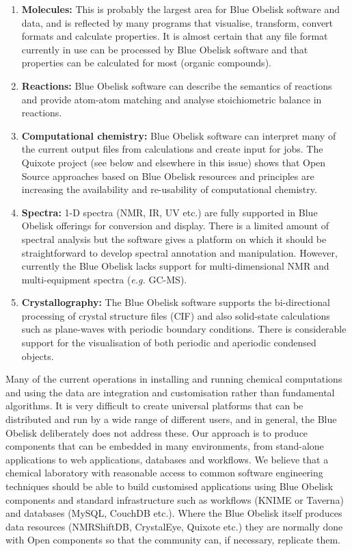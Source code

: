 \documentclass[10pt]{bmc_article}
\newenvironment{bmcformat}{\fussy\setboolean{publ}{true}}{\fussy}
\begin{document}
\begin{bmcformat}
\begin{enumerate}
\item {\bf Molecules:} This is probably the largest area for Blue
Obelisk software and data, and is reflected by many programs that
visualise, transform, convert formats and calculate properties. It is
almost certain that any file format currently in use can be processed by Blue
Obelisk software and that properties can be calculated for most (organic
compounds).
\item {\bf Reactions:} Blue Obelisk software can describe the
semantics of reactions and provide atom-atom matching and analyse
stoichiometric balance in reactions.
\item {\bf Computational chemistry:} Blue Obelisk software can
interpret many of the current output files from calculations and
create input for jobs. The Quixote project (see below and elsewhere in
this issue) shows that Open Source approaches based on Blue Obelisk
resources and principles are increasing the availability and
re-usability of computational chemistry.
\item {\bf Spectra:} 1-D spectra (NMR, IR, UV etc.) are fully
supported in Blue Obelisk offerings for conversion and display. There
is a limited amount of spectral analysis but the software gives a
platform on which it should be straightforward to develop spectral
annotation and manipulation. However, currently the Blue Obelisk lacks
support for multi-dimensional NMR and multi-equipment spectra
({\it e.g.} GC-MS).
\item {\bf Crystallography:} The Blue Obelisk software supports the
bi-directional processing of crystal structure files (CIF) and also
solid-state calculations such as plane-waves with periodic boundary
conditions. There is considerable support for the visualisation of
both periodic and aperiodic condensed objects.
\end{enumerate}

Many of the current operations in installing and running chemical
computations and using the data are integration and customisation
rather than fundamental algorithms. It is very difficult to create
universal platforms that can be distributed and run by a wide range of
different users, and in general, the Blue Obelisk deliberately does
not address these. Our approach is to produce components that can be
embedded in many environments, from stand-alone applications to web
applications, databases and workflows.
We believe that a chemical laboratory with reasonable access to common
software engineering techniques should be able to build customised applications
using Blue Obelisk components and standard infrastructure such as
workflows (KNIME or Taverna) and databases (MySQL, CouchDB etc.).
Where the Blue Obelisk itself produces data resources (NMRShiftDB,
CrystalEye, Quixote etc.) they are normally done with Open components
so that the community can, if necessary, replicate them.


\end{bmcformat}
\end{document}
